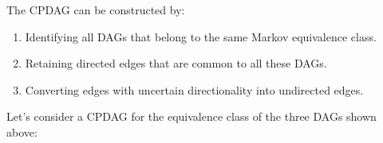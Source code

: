 \documentclass[letterpaper,10pt,english]{jupyterBook}
\begin{document}
\sphinxAtStartPar
The CPDAG can be constructed by:
\begin{enumerate}
%
\item {} 
\sphinxAtStartPar
Identifying all DAGs that belong to the same Markov equivalence class.

\item {} 
\sphinxAtStartPar
Retaining directed edges that are common to all these DAGs.

\item {} 
\sphinxAtStartPar
Converting edges with uncertain directionality into undirected edges.

\end{enumerate}

\sphinxAtStartPar
Let’s consider a CPDAG for the equivalence class of the three DAGs shown above:
\end{document}
